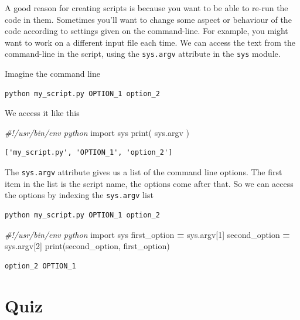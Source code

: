 \documentclass[]{book}
\newenvironment{Shaded}{\begin{snugshade}}{\end{snugshade}}
\newcommand{\BuiltInTok}[1]{#1}
\newcommand{\CommentTok}[1]{\textcolor[rgb]{0.56,0.35,0.01}{\textit{#1}}}
\newcommand{\DecValTok}[1]{\textcolor[rgb]{0.00,0.00,0.81}{#1}}
\newcommand{\ImportTok}[1]{#1}
\newcommand{\NormalTok}[1]{#1}
\newcommand{\OperatorTok}[1]{\textcolor[rgb]{0.81,0.36,0.00}{\textbf{#1}}}
\theoremstyle{definition}
\theoremstyle{definition}
\theoremstyle{definition}
\theoremstyle{remark}
\begin{document}
A good reason for creating scripts is because you want to be able to
re-run the code in them. Sometimes you'll want to change some aspect or
behaviour of the code according to settings given on the command-line.
For example, you might want to work on a different input file each time.
We can access the text from the command-line in the script, using the
\texttt{sys.argv} attribute in the \texttt{sys} module.

Imagine the command line

\begin{verbatim}
python my_script.py OPTION_1 option_2
\end{verbatim}

We access it like this

\begin{Shaded}
\begin{Highlighting}[]
\CommentTok{#!/usr/bin/env python}
\ImportTok{import}\NormalTok{ sys}
\BuiltInTok{print}\NormalTok{( sys.argv )}
\end{Highlighting}
\end{Shaded}

\begin{verbatim}
['my_script.py', 'OPTION_1', 'option_2']
\end{verbatim}

The \texttt{sys.argv} attribute gives us a list of the command line
options. The first item in the list is the script name, the options come
after that. So we can access the options by indexing the
\texttt{sys.argv} list

\begin{verbatim}
python my_script.py OPTION_1 option_2
\end{verbatim}

\begin{Shaded}
\begin{Highlighting}[]
\CommentTok{#!/usr/bin/env python}
\ImportTok{import}\NormalTok{ sys}
\NormalTok{first_option }\OperatorTok{=}\NormalTok{ sys.argv[}\DecValTok{1}\NormalTok{]}
\NormalTok{second_option }\OperatorTok{=}\NormalTok{ sys.argv[}\DecValTok{2}\NormalTok{]}
\BuiltInTok{print}\NormalTok{(second_option, first_option)}
\end{Highlighting}
\end{Shaded}

\begin{verbatim}
option_2 OPTION_1
\end{verbatim}

\hypertarget{quiz-6}{%
\section{Quiz}\label{quiz-6}}
\end{document}
